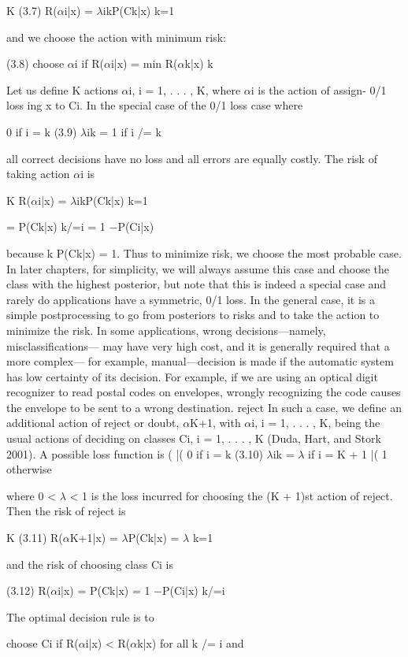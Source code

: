 K (3.7) R($\alpha$i|x) = $\lambda$ikP(Ck|x) k=1

and we choose the action with minimum risk:

(3.8) choose $\alpha$i if R($\alpha$i|x) = min R($\alpha$k|x) k

Let us define K actions $\alpha$i, i = 1, . . . , K, where $\alpha$i is the action of assign- 0/1 loss ing x to Ci. In the special case of the 0/1 loss case where

0 if i = k (3.9) $\lambda$ik = 1 if i /= k

all correct decisions have no loss and all errors are equally costly. The risk of taking action $\alpha$i is

K R($\alpha$i|x) = $\lambda$ikP(Ck|x) k=1

= P(Ck|x) k/=i = 1 $-$P(Ci|x)

because k P(Ck|x) = 1. Thus to minimize risk, we choose the most probable case. In later chapters, for simplicity, we will always assume this case and choose the class with the highest posterior, but note that this is indeed a special case and rarely do applications have a symmetric, 0/1 loss. In the general case, it is a simple postprocessing to go from posteriors to risks and to take the action to minimize the risk. In some applications, wrong decisions---namely, misclassifications--- may have very high cost, and it is generally required that a more complex--- for example, manual---decision is made if the automatic system has low certainty of its decision. For example, if we are using an optical digit recognizer to read postal codes on envelopes, wrongly recognizing the code causes the envelope to be sent to a wrong destination. reject In such a case, we define an additional action of reject or doubt, $\alpha$K+1, with $\alpha$i, i = 1, . . . , K, being the usual actions of deciding on classes Ci, i = 1, . . . , K (Duda, Hart, and Stork 2001). A possible loss function is ( |( 0 if i = k (3.10) $\lambda$ik = $\lambda$ if i = K + 1 |( 1 otherwise

where 0 < $\lambda$ < 1 is the loss incurred for choosing the (K + 1)st action of reject. Then the risk of reject is

K (3.11) R($\alpha$K+1|x) = $\lambda$P(Ck|x) = $\lambda$ k=1

and the risk of choosing class Ci is

(3.12) R($\alpha$i|x) = P(Ck|x) = 1 $-$P(Ci|x) k/=i

The optimal decision rule is to

choose Ci if R($\alpha$i|x) < R($\alpha$k|x) for all k /= i and

